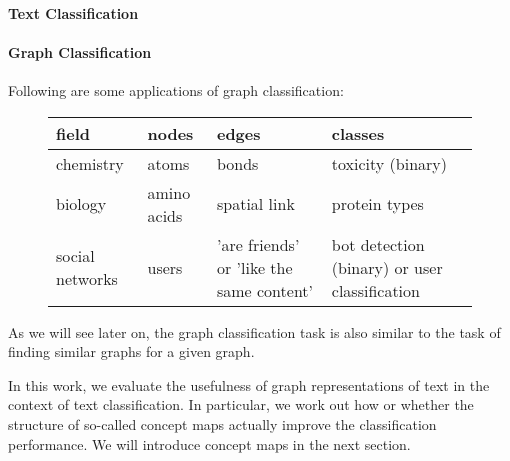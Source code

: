 

\paragraph{Text Classification}

\paragraph{Graph Classification}

Following are some applications of graph classification:

\begin{figure}[htb!]
\centering
\begin{tabular}{llll}
field & nodes & edges & classes \\
\midrule
chemistry & atoms & bonds & toxicity (binary) \\
biology & amino acids & spatial link & protein types \\ 
social networks & users & 'are friends' or 'like the same content' & bot detection (binary) or user classification
\end{tabular}
\end{figure}

As we will see later on, the graph classification task is also similar to the task of finding similar graphs for a given graph.

In this work, we evaluate the usefulness of graph representations of text in the context of text classification. In particular, we work out how or whether the structure of so-called concept maps actually improve the classification performance.
We will introduce concept maps in the next section.


